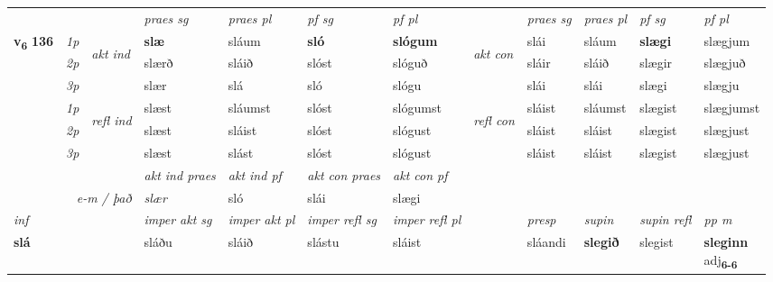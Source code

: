 \begin{longtable}[l]{X>{\footnotesize\itshape}llXXXXlXXXX}
 & &   & \textit{praes sg}  & \textit{praes pl}    & \textit{ pf sg} & \textit{pf pl} & & \textit{praes sg}  & \textit{praes pl}    & \textit{pf sg} & \textit{pf pl }  \\ \cmidrule{4-7} \cmidrule{9-12}
 \multirow{2}{*}{{{\textbf{v{\textsubscript{6}}} \Large{\textbf{136}}}}}  & 1p & \multirow{3}{*}{\begin{turn}{90}\textit{akt ind}\end{turn}} & \textbf{slæ} & sláum & \textbf{sló} & \textbf{slógum} & \multirow{3}{*}{\begin{turn}{90}\textit{akt con}\end{turn}} &slái & sláum & \textbf{slægi} & slægjum\\*
 & 2p &  &  slærð  & sláið & slóst & slóguð & & sláir & sláið & slægir & slægjuð \\*
 & 3p &  & slær & slá & sló & slógu & & slái & slái& slægi & slægju \\*
\cmidrule{4-7} \cmidrule{9-12}
 & 1p & \multirow{3}{*}{\begin{turn}{90}\textit{refl ind}\end{turn}}  & slæst & sláumst & slóst & slógumst & \multirow{3}{*}{\begin{turn}{90}\textit{refl con}\end{turn}}  &sláist & sláumst & slægist & slægjumst \\*
 & 2p &  & slæst & sláist & slóst & slógust & &sláist & sláist & slægist & slægjust \\*
 & 3p  & & slæst & slást & slóst & slógust & & sláist & sláist& slægist & slægjust \\*
\cmidrule{4-7} \cmidrule{9-12}

   && &  \textit{akt ind praes} & \textit{akt ind pf} & \textit{akt con praes} & \textit{akt con pf} \\*
\multicolumn{3}{r}{\textit{e-m / það}} & slær & sló & slái & slægi \\*

\cmidrule{4-7}
   {\textit{inf}} & &  & \textit{imper akt sg} & \textit{imper akt pl} & \textit{imper refl sg} & \textit{imper refl pl} && \textit{presp} & \textit{supin} & \textit{supin refl} & \textit{pp m} \\*
  {\textbf{slá}} & && sláðu  & sláið & slástu & sláist && sláandi &  \textbf{slegið} & slegist & \specialcell{\textbf{sleginn} \\ adj\textbf{\textsubscript{6-6}}} \\*

\midrule


\end{longtable}
